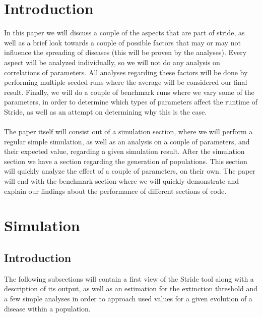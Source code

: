 \documentclass[runningheads]{llncs}
\begin{document}
	\section{Introduction}
	In this paper we will discuss a couple of the aspects that are part of stride, as well as a brief look towards a couple of possible factors that may or may not influence the spreading of diseases (this will be proven by the analyses). Every aspect will be analyzed individually, so we will not do any analysis on correlations of parameters. All analyses regarding these factors will be done by performing multiple seeded runs where the average will be considered our final result. Finally, we will do a couple of benchmark runs where we vary some of the parameters, in order to determine which types of parameters affect the runtime of Stride, as well as an attempt on determining why this is the case. \\
	\\
	The paper itself will consist out of a simulation section, where we will perform a regular simple simulation, as well as an analysis on a couple of parameters, and their expected value, regarding a given simulation result. After the simulation section we have a section regarding the generation of populations. This section will quickly analyze the effect of a couple of parameters, on their own. The paper will end with the benchmark section where we will quickly demonstrate and explain our findings about the performance of different sections of code.
	
	\section{Simulation}
	
	\subsection{Introduction}
	The following subsections will contain a first view of the Stride tool along with a description of its output, as well as an estimation for the extinction threshold and a few simple analyses in order to approach used values for a given evolution of a disease within a population.
	
\end{document}
